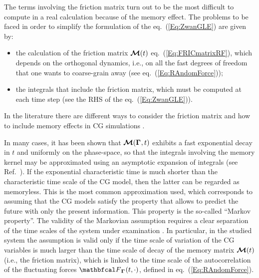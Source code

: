 \documentclass[10pt,a4paper]{book}
\theoremstyle{definition}
\begin{document}
The terms involving the friction matrix turn out to be the most difficult to compute in a real calculation because of the memory effect. 
The problems to be faced in order to simplify the formulation of the eq.~(\ref{Eq:ZwanGLE}) are given by:
\begin{itemize}
\item[-] the calculation of the friction matrix $\boldsymbol{\mathcal{M}}(t)$ eq.~(\ref{Eq:FRICmatrixRF}), which depends on the orthogonal dynamics, i.e., on all the fast degrees of freedom that one wants to coarse-grain away (see eq.~(\ref{Eq:RAndomForce}));   
\item[-] the integrals that include the friction matrix, which must be computed at each time step (see the RHS of the eq.~(\ref{Eq:ZwanGLE})).
\end{itemize}
In the literature there are different ways to consider the friction matrix \cite{Chorin2000,Kauzlaric2011} and how to include memory effects in CG simulations \cite{Izvekov2017,Jung2017,Li2015,Yuanran2018}.

In many cases, it has been shown that $\boldsymbol{\mathcal{M}}(\boldsymbol\Gamma_{},t)$ exhibits a fast exponential decay in $t$ and uniformly on the phase-space, so that the integrals involving the memory kernel may be approximated using an asymptotic expansion of integrals (see Ref.~\cite{bernardini1993Metodi,bleisteinAsExpInt,DiPasquale2019}). If the exponential characteristic time is much shorter than the characteristic time scale of the CG model, then the latter can be regarded as memoryless. This is the most common approximation used, which corresponds to assuming that the CG models satisfy the property that allows to predict the future with only the present information. This property is the so-called ``Markov property''.
The validity of the Markovian assumption requires a clear separation of the time scales of the system under examination \cite{DiPasquale2019,Hijon2010,Hijon2006}.
In particular, in the studied system the assumption is valid only if the time scale of variation of the CG variables is much larger than the time scale of decay of the memory matrix $\boldsymbol{\mathcal{M}}(t)$ (i.e., the friction matrix), which is linked to the time scale of the autocorrelation of the fluctuating forces $\fprojbf_{\Bphase{}}(t,\cdot)$, defined in eq.~(\ref{Eq:RAndomForce}).
\end{document}
